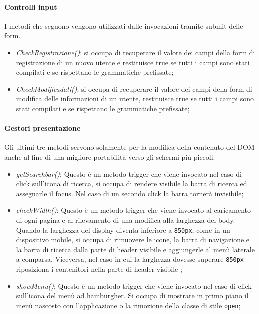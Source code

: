 \paragraph{Controlli input}
I metodi che seguono vengono utilizzati dalle invocazioni tramite submit delle form.
\begin{itemize}
    \item \textit{CheckRegistrazione()}: si occupa di recuperare il valore dei campi della form di registrazione di un nuovo utente e restituisce true se tutti i campi sono stati compilati e se rispettano le grammatiche prefissate;
    \item \textit{CheckModificadati()}: si occupa di recuperare il valore dei campi della form di modifica delle informazioni di un utente, restituisce true se tutti i campi sono stati compilati e se rispettano le grammatiche prefissate;
\end{itemize}
\paragraph{Gestori presentazione}
Gli ultimi tre metodi servono solamente per la modifica della contenuto del DOM anche al fine di una migliore portabilità verso gli schermi più piccoli.
\begin{itemize}
    \item \textit{getSearchbar()}: Questo è un metodo trigger che viene invocato nel caso di click sull'icona di ricerca, si occupa di rendere visibile la barra di ricerca ed assegnarle il focus. Nel caso di un secondo click la barra tornerà invisibile;
    \item \textit{checkWidth()}: Questo è un metodo trigger che viene invocato al caricamento di ogni pagina e al rilevamento di una modifica alla larghezza del body. Quando la larghezza del display diventa inferiore a \verb|850px|, come in un dispositivo mobile, si occupa di rimuovere le icone, la barra di navigazione e la barra di ricerca dalla parte di header visibile e aggiungerle al menù laterale a comparsa.
    Viceversa, nel caso in cui la larghezza dovesse superare \verb|850px| riposiziona i contenitori nella parte di header visibile ;
    \item \textit{showMenu()}: Questo è un metodo trigger che viene invocato nel caso di click sull'icona del menù ad hamburgher. Si occupa di mostrare in primo piano il menù nascosto con l'applicazione o la rimozione della classe di stile \verb|open|;
\end{itemize}


